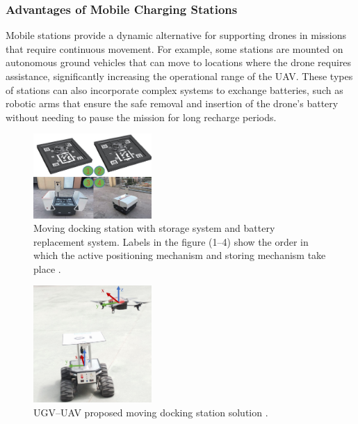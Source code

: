 \subsubsection{Advantages of Mobile Charging Stations}
    Mobile stations provide a dynamic alternative for supporting drones in missions that require continuous movement. For example, some stations are mounted on autonomous ground vehicles that can move to locations where the drone requires assistance, significantly increasing the operational range of the UAV. These types of stations can also incorporate complex systems to exchange batteries, such as robotic arms that ensure the safe removal and insertion of the drone's battery without needing to pause the mission for long recharge periods.
    
    \begin{figure}[h!]
        \centering
        \includegraphics[width=0.4\textwidth]{pictures/mobile_1.png}
        \caption{Moving docking station with storage system and battery replacement system. Labels in the figure (1–4) show the order in which the active positioning mechanism and storing mechanism take place \cite{grlj_docking_stations}.}
        \label{fig:mobile_charging}
    \end{figure}

    \begin{figure}[h!]
        \centering
        \includegraphics[width=0.4\textwidth]{pictures/mobile_2.png}
        \caption{UGV–UAV proposed moving docking station solution \cite{grlj_docking_stations}.}
        \label{fig:mobile_charging}
    \end{figure}

